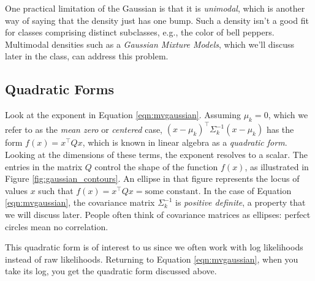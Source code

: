 \documentclass[a4paper]{article}
\begin{document}
One practical limitation of the Gaussian is that it is \emph{unimodal}, which is another way of saying that the density just has one bump.  Such a density isn't a good fit for classes comprising distinct subclasses, e.g., the color of bell peppers.   Multimodal densities such as a \emph{Gaussian Mixture Models}, which we'll discuss later in the class, can address this problem.


\subsection{Quadratic Forms}
Look at the exponent in Equation \ref{eqn:mvgaussian}.  Assuming $\mu_k = 0$, which we refer to as the \emph{mean zero} or \emph{centered} case, $(x-\mu_k)^\top\Sigma_k^{-1}(x-\mu_k)$ has the form $f(x)=x^\top Qx$, which is known in linear algebra as a \emph{quadratic form}.  Looking at the dimensions of these terms, the exponent resolves to a scalar.  The entries in the matrix $Q$ control the shape of the function $f(x)$, as illustrated in Figure \ref{fig:gaussian_contours}.  An ellipse in that figure represents the locus of values $x$ such that $f(x)=x^\top Q x=\text{some constant}$.  In the case of Equation \ref{eqn:mvgaussian}, the covariance matrix $\Sigma_k^{-1}$ is \emph{positive definite}, a property that we will discuss later.  People often think of covariance matrices as ellipses: perfect circles mean no correlation.

This quadratic form is of interest to us since we often work with log likelihoods instead of raw likelihoods.  Returning to Equation \ref{eqn:mvgaussian}, when you take its log, you get the quadratic form discussed above.
\end{document}
